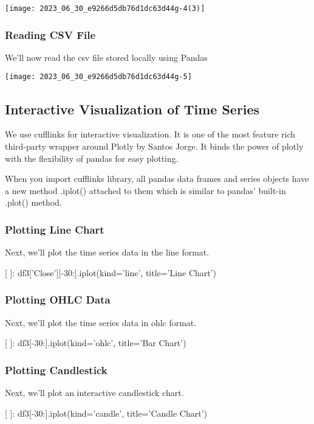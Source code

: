 \documentclass[10pt]{article}
\begin{document}
\begin{center}
\texttt{[image: 2023\_06\_30\_e9266d5db76d1dc63d44g-4(3)]}
\end{center}

\subsubsection*{Reading CSV File}
We'll now read the csv file stored locally using Pandas

\begin{center}
\texttt{[image: 2023\_06\_30\_e9266d5db76d1dc63d44g-5]}
\end{center}

\subsection*{Interactive Visualization of Time Series}
We use cufflinks for interactive visualization. It is one of the most feature rich third-party wrapper around Plotly by Santos Jorge. It binds the power of plotly with the flexibility of pandas for easy plotting.

When you import cufflinks library, all pandas data frames and series objects have a new method .iplot() attached to them which is similar to pandas' built-in .plot() method.

\subsubsection*{Plotting Line Chart}
Next, we'll plot the time series data in the line format.

[ ]: df3['Close'][-30:].iplot(kind='line', title='Line Chart')

\subsubsection*{Plotting OHLC Data}
Next, we'll plot the time series data in ohlc format.

[ ]: df3[-30:].iplot(kind='ohlc', title='Bar Chart')

\subsubsection*{Plotting Candlestick}
Next, we'll plot an interactive candlestick chart.

[ ]: df3[-30:].iplot(kind='candle', title='Candle Chart')
\end{document}
